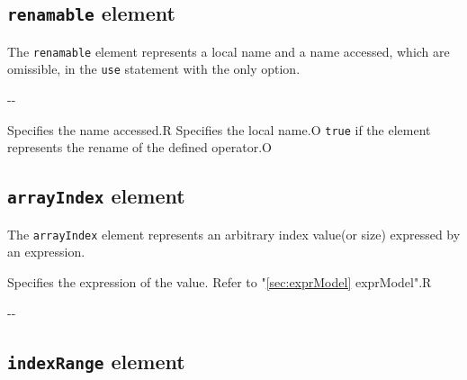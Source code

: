 \subsection{ {\tt renamable} element}

The {\tt renamable} element represents a local name and a name accessed, which are omissible, in the {\tt use} statement with the only option.


\begin{XcodeMLChildElements}
\XcodeMLElementDef{-}
{-}{-}
\end{XcodeMLChildElements}

\begin{XcodeMLAttributes}
{Specifies the name accessed.}{R}
{Specifies the local name.}{O}
{{\tt true} if the element represents the rename of the defined operator.}{O}
\end{XcodeMLAttributes}


\subsection{ {\tt arrayIndex} element}

The {\tt arrayIndex} element represents an arbitrary index value(or size) expressed by an expression.


\begin{XcodeMLChildElements}
{Specifies the expression of the value. Refer to "\ref{sec:exprModel} exprModel".}{R}
\end{XcodeMLChildElements}

\begin{XcodeMLAttributes}
\XcodeMLAttrDef{-}{-}
{-}{-}
\end{XcodeMLAttributes}


\subsection{ {\tt indexRange} element}

